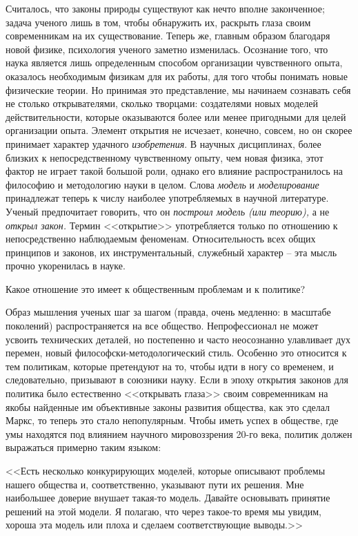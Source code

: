 \documentclass{book}
\begin{document}
Считалось, что законы природы существуют как нечто вполне законченное; задача ученого лишь в том, чтобы обнаружить их, раскрыть глаза своим современникам на их существование. Теперь же, главным образом благодаря новой физике, психо­логия ученого заметно изменилась. Осознание того, что наука является лишь определенным способом организации чувственного опыта, оказалось необходимым физикам для их работы, для того чтобы понимать новые физические теории. Но прини­мая это представление, мы начинаем сознавать себя не столько открывателями, сколько творцами: создателями новых моде­лей действительности, которые оказываются более или менее пригодными для целей организации опыта. Элемент открытия не исчезает, конечно, совсем, но он скорее принимает характер удачного \textit{изобретения}.  В научных дисциплинах, более близких к непосредственному чувственному опыту, чем новая физика, этот фактор не играет такой большой роли, однако его влияние распространилось на философию и методологию науки в целом. Слова \textit{
модель}  и \textit{моделирование}  принадлежат теперь к числу наиболее употребляемых в научной литературе. Ученый пред­почитает говорить, что он \textit{построил модель (или теорию),}  а не \textit{открыл закон.}  Термин <<открытие>> употребляется только по от­ношению к непосредственно наблюдаемым феноменам. Относи­тельность всех общих принципов и законов, их инструменталь­ный, служебный характер -- эта мысль прочно укоренилась в науке.

Какое отношение это имеет к общественным проблемам и к политике?

Образ мышления ученых шаг за шагом (правда, очень мед­ленно: в масштабе поколений) распространяется на все общест­во. Непрофессионал не может усвоить технических деталей, но постепенно и часто неосознанно улавливает дух перемен, новый философски-методологический стиль. Особенно это относится к тем политикам, которые претендуют на то, чтобы идти в ногу со временем, и следовательно, призывают в союзники науку. Если в эпоху открытия законов для политика было естественно <<открывать глаза>> своим современникам на якобы найден­ные им объективные законы развития общества, как это сделал Маркс, то теперь это стало непопулярным. Чтобы иметь успех в обществе, где умы находятся под влиянием научного мировоззрения 20-го века, политик должен выражаться примерно таким языком:

<<Есть несколько конкурирующих моделей, которые описы­вают проблемы нашего общества и, соответственно, указывают пути их решения. Мне наибольшее доверие внушает такая-то модель. Давайте основывать принятие решений на этой модели. Я полагаю, что через такое-то время мы увидим, хороша эта модель или плоха и сделаем соответствующие выводы.>>
\end{document}
